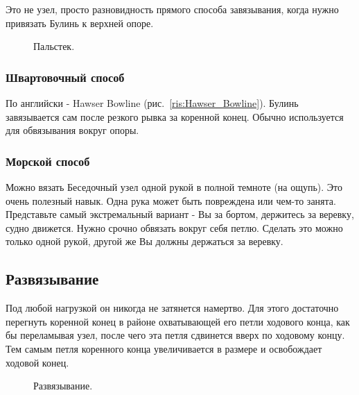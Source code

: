 Это не узел, просто разновидность прямого способа завязывания, когда нужно привязать Булинь к верхней опоре.

\begin{figure}[H]\centering
	\begin{minipage}{1\linewidth}
		\begin{center}
			\tcbox[enhanced jigsaw,colframe=black,opacityframe=0.5,opacityback=0.5]
			{\centering{}}
		\end{center}
	\end{minipage}
\caption{Пальстек.}
\label{ris:Palstek}
\end{figure}

\subsubsection*{Швартовочный способ}

По английски - Hawser Bowline (рис.~\ref{ris:Hawser_Bowline}). Булинь завязывается сам после резкого рывка за коренной конец. Обычно используется для обвязывания вокруг опоры.

\subsubsection*{Морской способ}

Можно вязать Беседочный узел одной рукой в полной темноте (на ощупь). Это очень полезный навык. Одна рука может быть повреждена или чем-то занята. Представьте самый экстремальный вариант - Вы за бортом, держитесь за веревку, судно движется. Нужно срочно обвязать вокруг себя петлю. Сделать это можно только одной рукой, другой же Вы должны держаться за веревку.

\subsection{Развязывание}

Под любой нагрузкой он никогда не затянется намертво. Для этого достаточно перегнуть коренной конец в районе охватывающей его петли ходового конца, как бы переламывая узел, после чего эта петля сдвинется вверх по ходовому концу. Тем самым петля коренного конца увеличивается в размере и освобождает ходовой конец.

\begin{figure}[H]\centering
	\begin{minipage}{1\linewidth}
		\begin{center}
			\tcbox[enhanced jigsaw,colframe=black,opacityframe=0.5,opacityback=0.5]
			{\centering{}}
		\end{center}
	\end{minipage}
\caption{Развязывание.}
\label{ris:Besedochny_razvyazivanie}
\end{figure}

